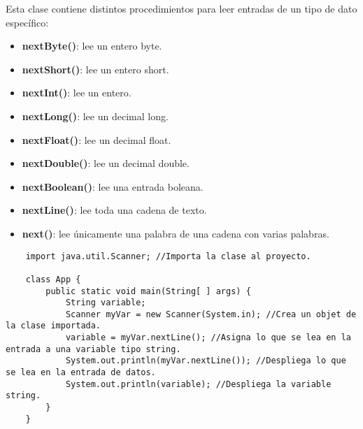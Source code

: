 Esta clase contiene distintos procedimientos para leer entradas de un tipo de dato específico:
\begin{itemize}
    \item \textbf{nextByte()}: lee un entero byte.
    \item \textbf{nextShort()}: lee un entero short.
    \item \textbf{nextInt()}: lee un entero.
    \item \textbf{nextLong()}: lee un decimal long.
    \item \textbf{nextFloat()}: lee un decimal float.
    \item \textbf{nextDouble()}: lee un decimal double.
    \item \textbf{nextBoolean()}: lee una entrada boleana.
    \item \textbf{nextLine()}: lee toda una cadena de texto.
    \item \textbf{next()}: lee únicamente una palabra de una cadena con varias palabras.
\end{itemize}
\begin{lstlisting}
    import java.util.Scanner; //Importa la clase al proyecto.

    class App {
        public static void main(String[ ] args) {
            String variable;
            Scanner myVar = new Scanner(System.in); //Crea un objet de la clase importada.
            variable = myVar.nextLine(); //Asigna lo que se lea en la entrada a una variable tipo string.
            System.out.println(myVar.nextLine()); //Despliega lo que se lea en la entrada de datos.
            System.out.println(variable); //Despliega la variable string.
        }
    }
\end{lstlisting}